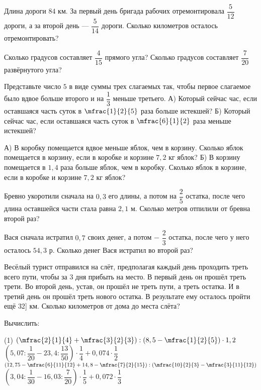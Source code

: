 \begin{class}[number=6]
	\begin{listofex}
		\item Длина дороги \(84\) км. За первый день бригада рабочих отремонтировала \(\dfrac{5}{12}\) дороги, а за второй день --- \(\dfrac{5}{14}\) дороги. Сколько километров осталось отремонтировать?
		\item Сколько градусов составляет \(\dfrac{4}{15}\) прямого угла? Сколько градусов составляет \(\dfrac{7}{20}\) развёрнутого угла?
		\item Представьте число \(5\) в виде суммы трех слагаемых так, чтобы первое слагаемое было вдвое больше второго и на \(\dfrac{1}{3}\) меньше третьего.
		А) Который сейчас час, если оставшаяся часть суток в \(\mfrac{1}{2}{5}\) раза больше истекшей? Б) Который сейчас час, если оставшаяся часть суток в \(\mfrac{6}{1}{2}\) раза меньше истекшей?
		\item А) В коробку помещается вдвое меньше яблок, чем в корзину. Сколько яблок помещается в корзину, если в коробке и корзине \(7,2\) кг яблок? Б) В корзину помещается в \(1,4\) раза больше яблок, чем в коробку. Сколько яблок в корзине, если в коробке и корзине \( 7,2\) кг яблок?
		\item Бревно укоротили сначала на \(0,3\) его длины, а потом на \(\dfrac{2}{5}\)  остатка, после чего длина оставшейся части стала равна \(2,1\) м. Сколько метров отпилили от бревна второй раз?
		\item Вася сначала истратил \(0,7\) своих денег, а потом − \(\dfrac{2}{3}\) остатка, после чего у него осталось \(54,3\) р. Сколько денег Вася истратил во второй раз?
		\item Весёлый турист отправился на слёт, предполагая каждый день проходить треть всего пути, чтобы за \(3\) дня прибыть на место. В первый день он прошёл треть трети. Во второй день, устав, он прошёл не треть пути, а треть остатка. И в третий день он прошёл треть нового остатка. В результате ему осталось пройти ещё \(32\)] км. Сколько километров от дома до места слёта?
		\item Вычислить:
		\begin{tasks}(1)
			\task \(\left(\mfrac{2}{1}{4}+\mfrac{3}{2}{3}\right):\left(8,5-\mfrac{1}{2}{5}\right) \cdot 1,2\)
			\task \(\left(5,07:\dfrac{1}{20}-23,4: \dfrac{13}{50}\right) \cdot \dfrac{1}{4} + 0,074 \cdot \dfrac{1}{2}\)
			\task \( \left( 12,75 - \mfrac{6}{11}{12} + 14,8 - \mfrac{7}{2}{15}\right): \left( \mfrac{10}{2}{3} - \mfrac{3}{11}{12} \right) \)
			\task \(\left(3,04:\dfrac{1}{30}-16,03: \dfrac{7}{20}\right) \cdot \dfrac{1}{5} + 0,072 \cdot \dfrac{1}{3}\)
		\end{tasks}
	\end{listofex}
\end{class}
%
%
%	
